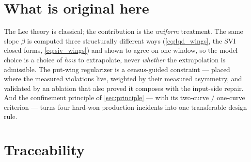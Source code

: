 \documentclass[11pt]{article}
\begin{document}
\section{What is original here}
\label{sec:original}

The Lee theory is classical; the contribution is the \emph{uniform}
treatment. The same slope $\beta$ is computed three structurally different
ways (\eqref{eq:lqd_wings}, the SVI closed forms, \eqref{eq:siv_wings}) and
shown to agree on one window, so the model choice is a choice of \emph{how}
to extrapolate, never \emph{whether} the extrapolation is admissible. The
put-wing regularizer is a census-guided constraint --- placed where the
measured violations live, weighted by their measured asymmetry, and validated
by an ablation that also proved it composes with the input-side repair. And
the confinement principle of \cref{sec:principle} --- with its two-curve /
one-curve criterion --- turns four hard-won production incidents into one
transferable design rule.

\section{Traceability}
\label{sec:traceability}
\end{document}
